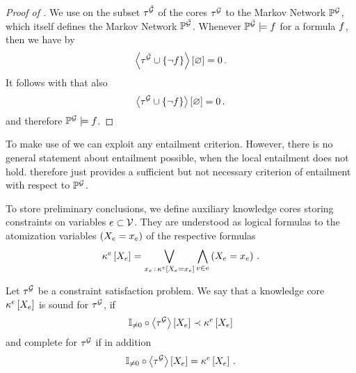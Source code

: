 \begin{proof}[Proof of ]
    We use  on the subset $\tau^{\tilde{\mathcal{G}}}$ of the cores $\tau^{\mathcal{G}}$ to the Markov Network $\mathbb{P}^{\mathcal{G}}$, which itself defines the Markov Network $\mathbb{P}^{\tilde{\mathcal{G}}}$.
    Whenever $\mathbb{P}^{\tilde{\mathcal{G}}}\models f$ for a formula $f$, then we have by 
    \begin{align*}
        \left\langle \tau^{\tilde{\mathcal{G}}} \cup\{\lnot f\}\right\rangle \left[ \varnothing \right] = 0 \, .
    \end{align*}
    It follows with  that also
    \begin{align*}
        \left\langle \tau^{\mathcal{G}} \cup\{\lnot f\}\right\rangle \left[ \varnothing \right] = 0 \, .
    \end{align*}
    and therefore $\mathbb{P}^{\mathcal{G}}\models f$.
\end{proof}


\begin{remark}
    To make use of  we can exploit any entailment criterion.
    However, there is no general statement about entailment possible, when the local entailment does not hold.
     therefore just provides a sufficient but not necessary criterion of entailment with respect to $\mathbb{P}^{\mathcal{G}}$.
\end{remark}


To store preliminary conclusions, we define auxiliary knowledge cores storing constraints on variables $e\subset\mathcal{V}$.
They are understood as logical formulas to the atomization variables $\left(X_{e}=x_{e}\right)$ of the respective formulas
\begin{align*}
    \kappa^{e}\left[X_{e}\right]
    = \bigvee_{x_{e} \, : \, \kappa^{e}\left[X_{e}=x_{e}\right]} \bigwedge_{v\in e} \left(X_{e}=x_{e}\right) \, .
\end{align*}

\begin{definition}\label{def:knowledgeCoreSoundComplete}
    Let $\tau^{\mathcal{G}}$ be a constraint satisfaction problem. %
    We say that a knowledge core $\kappa^{e}\left[X_{e}\right]$ is sound for $\tau^{\mathcal{G}}$, if
    \begin{align*}
        \mathbb{I}_{\neq0}\circ\left\langle \tau^{\mathcal{G}}\right\rangle \left[ X_{e} \right]  \prec \kappa^{e}\left[X_{e}\right]
    \end{align*}
    and complete for $\tau^{\mathcal{G}}$ if in addition
    \begin{align*}
        \mathbb{I}_{\neq0}\circ\left\langle \tau^{\mathcal{G}}\right\rangle \left[ X_{e} \right]=\kappa^{e}\left[X_{e}\right] \, .
    \end{align*}
\end{definition}


